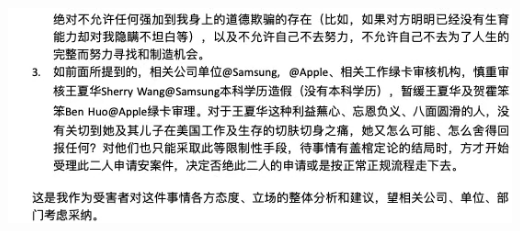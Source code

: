 \documentclass[9pt, b5paper]{article}
\begin{document}
\begin{center}
\includegraphics[width=.9\linewidth]{./pic/5.jpg}
\end{center}
\end{document}

